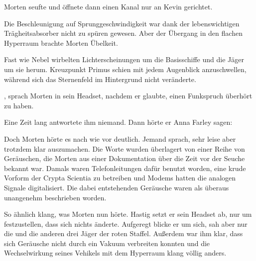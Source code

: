 \par

Morten seufte und öffnete dann einen Kanal nur an Kevin gerichtet. 

\par


\par

Die Beschleunigung auf Sprunggeschwindigkeit war dank der lebenswichtigen Trägheitsabsorber nicht zu spüren gewesen. Aber der Übergang in den flachen Hyperraum brachte Morten Übelkeit.

\par

Fast wie Nebel wirbelten Lichterscheinungen um die Basisschiffe und die Jäger um sie herum. Kreuzpunkt Primus schien mit jedem Augenblick anzuschwellen, während sich das Sternenfeld im Hintergrund nicht veränderte.

\par

, sprach Morten in sein Headset, nachdem er glaubte, einen Funkspruch überhört zu haben.

\par

Eine Zeit lang antwortete ihm niemand.
Dann hörte er Anna Farley sagen: 

\par

Doch Morten hörte es nach wie vor deutlich. Jemand sprach, sehr leise aber trotzdem klar auszumachen. Die Worte wurden überlagert von einer Reihe von Geräuschen, die Morten aus einer Dokumentation über die Zeit vor der Seuche bekannt war. Damals waren Telefonleitungen dafür benutzt worden, eine krude Vorform der Crypta Scientia zu betreiben und Modems hatten die analogen Signale digitalisiert. Die dabei entstehenden Geräusche waren als überaus unangenehm beschrieben worden.

\par

So ähnlich klang, was Morten nun hörte. Hastig setzt er sein Headset ab, nur um festzustellen, dass sich nichts änderte. Aufgeregt blicke er um sich, sah aber nur die  und die anderen drei Jäger der roten Staffel. Außerdem war ihm klar, dass sich Geräusche nicht durch ein Vakuum verbreiten konnten und die Wechselwirkung seines Vehikels mit dem Hyperraum klang völlig anders.

